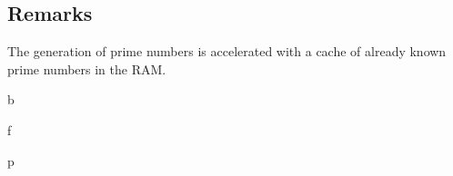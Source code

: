 \documentclass[letterpaper,10pt,english]{sphinxmanual}
\begin{document}
\subsection{Remarks}
\label{\detokenize{prime:remarks}}
The generation of prime numbers is accelerated with a cache of already known prime numbers in the RAM.


\renewcommand{\indexname}{Python Module Index}
\begin{sphinxtheindex}
\def\bigletter#1{{\Large\sffamily#1}\nopagebreak\vspace{1mm}}
\bigletter{b}
\item {}
\indexspace
\bigletter{f}
\item {}
\indexspace
\bigletter{p}
\item {}
\end{sphinxtheindex}

\renewcommand{\indexname}{Index}
\printindex
\end{document}
